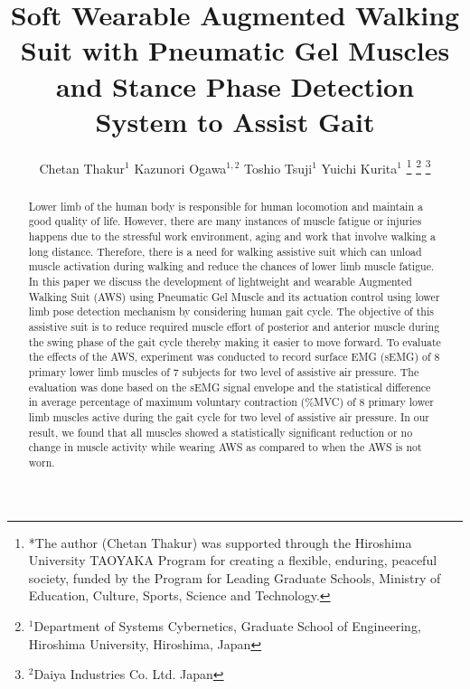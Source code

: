 \documentclass[letterpaper, 10 pt, conference]{ieeeconf}  %
\title{\LARGE \bf
Soft Wearable Augmented Walking Suit with Pneumatic Gel Muscles and Stance Phase Detection System to Assist Gait
}
\author{Chetan Thakur$^{1}$ Kazunori Ogawa$^{1,2}$ Toshio Tsuji$^{1}$ Yuichi Kurita$^{1}$%
\thanks{*The author (Chetan Thakur) was supported through the Hiroshima University
TAOYAKA Program for creating a flexible, enduring, peaceful society, funded by the Program for Leading
Graduate Schools, Ministry of Education, Culture, Sports, Science and Technology.}%
\thanks{$^{1}$Department of Systems Cybernetics, Graduate School of Engineering,
	Hiroshima University, Hiroshima, Japan
        {\tt\small }}%
\thanks{$^{2}$Daiya Industries Co. Ltd. Japan
        {\tt\small }}%
}
\begin{document}
\setlength{\pdfpageheight}{11in}
\setlength{\pdfpagewidth}{8.5in}

\maketitle
\thispagestyle{empty}
\pagestyle{empty}

\maketitle
\thispagestyle{empty}
\pagestyle{empty}


\begin{abstract}

Lower limb of the human body is responsible for human locomotion and maintain a good quality of life. However, there are many instances of muscle fatigue or injuries happens due to the stressful work environment, aging and work that involve walking a long distance. Therefore, there is a need for walking assistive suit which can unload muscle activation during walking and reduce the chances of lower limb muscle fatigue. In this paper we discuss the development of lightweight and wearable Augmented Walking Suit (AWS) using Pneumatic Gel Muscle and its actuation control using lower limb pose detection mechanism by considering human gait cycle. The objective of this assistive suit is to reduce required muscle effort of posterior and anterior muscle during the swing phase of the gait cycle thereby making it easier to move forward. To evaluate the effects of the AWS, experiment was conducted to record surface EMG (sEMG) of 8 primary lower limb muscles of 7 subjects for two level of assistive air pressure. The evaluation was done based on the sEMG signal envelope and the statistical difference in average percentage of maximum voluntary contraction (\%MVC) of 8 primary lower limb muscles active during the gait cycle for two level of assistive air pressure. In our result, we found that all muscles showed a statistically significant reduction or no change in muscle activity while wearing AWS as compared to when the AWS is not worn. 
\end{abstract}


\end{document}
